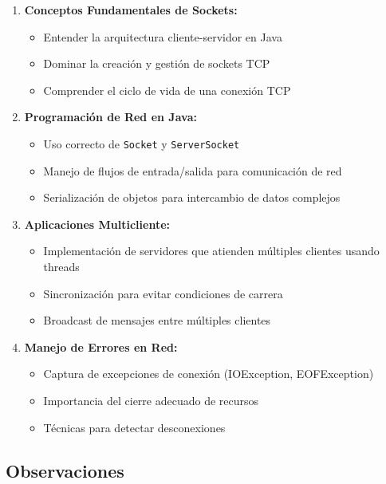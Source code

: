 \documentclass{article}
\begin{document}
\begin{enumerate}
    \item \textbf{Conceptos Fundamentales de Sockets:}
    \begin{itemize}
        \item Entender la arquitectura cliente-servidor en Java
        \item Dominar la creación y gestión de sockets TCP
        \item Comprender el ciclo de vida de una conexión TCP
    \end{itemize}
    
    \item \textbf{Programación de Red en Java:}
    \begin{itemize}
        \item Uso correcto de \texttt{Socket} y \texttt{ServerSocket}
        \item Manejo de flujos de entrada/salida para comunicación de red
        \item Serialización de objetos para intercambio de datos complejos
    \end{itemize}
    
    \item \textbf{Aplicaciones Multicliente:}
    \begin{itemize}
        \item Implementación de servidores que atienden múltiples clientes usando threads
        \item Sincronización para evitar condiciones de carrera
        \item Broadcast de mensajes entre múltiples clientes
    \end{itemize}
    
    \item \textbf{Manejo de Errores en Red:}
    \begin{itemize}
        \item Captura de excepciones de conexión (IOException, EOFException)
        \item Importancia del cierre adecuado de recursos
        \item Técnicas para detectar desconexiones
    \end{itemize}
\end{enumerate}

\subsection{Observaciones}
\end{document}

